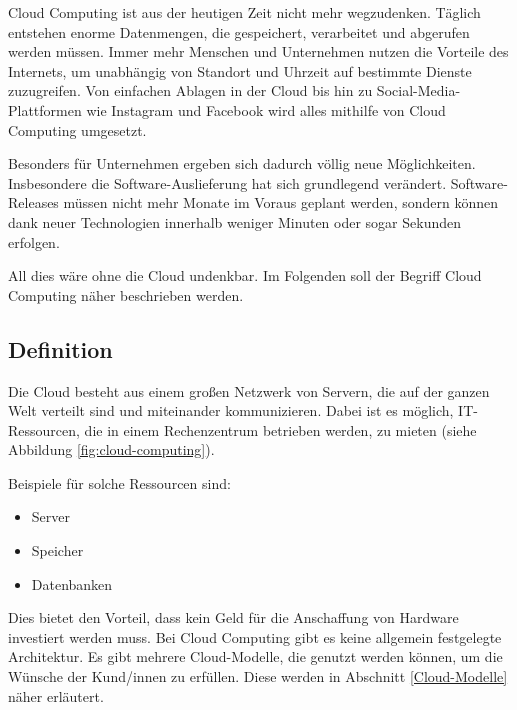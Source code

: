 
Cloud Computing ist aus der heutigen Zeit nicht mehr wegzudenken. Täglich entstehen enorme Datenmengen, die gespeichert, verarbeitet und abgerufen werden müssen. Immer mehr Menschen und Unternehmen nutzen die Vorteile des Internets, um unabhängig von Standort und Uhrzeit auf bestimmte Dienste zuzugreifen. Von einfachen Ablagen in der Cloud bis hin zu Social-Media-Plattformen wie Instagram und Facebook wird alles mithilfe von Cloud Computing umgesetzt.

Besonders für Unternehmen ergeben sich dadurch völlig neue Möglichkeiten. Insbesondere die Software-Auslieferung hat sich grundlegend verändert. 
Software-Releases müssen nicht mehr Monate im Voraus geplant werden, sondern können dank neuer Technologien innerhalb weniger Minuten oder sogar Sekunden erfolgen.\\
\cite{EA:Web59}

All dies wäre ohne die Cloud undenkbar. Im Folgenden soll der Begriff Cloud Computing näher beschrieben werden.



    \subsection{Definition}

    Die Cloud besteht aus einem großen Netzwerk von Servern, die auf der ganzen Welt verteilt sind und miteinander kommunizieren.
    Dabei ist es möglich, IT-Ressourcen, die in einem Rechenzentrum betrieben werden, zu mieten (siehe Abbildung \ref{fig:cloud-computing}). 
    
    Beispiele für solche Ressourcen sind:
    \begin{itemize}
        \item Server
        \item Speicher
        \item Datenbanken
    \end{itemize}

    Dies bietet den Vorteil, dass kein Geld für die Anschaffung von Hardware investiert werden muss. Bei Cloud Computing gibt es keine allgemein festgelegte Architektur. Es gibt mehrere Cloud-Modelle, die genutzt werden können, um die Wünsche der Kund/innen zu erfüllen.
    Diese werden in Abschnitt \ref{Cloud-Modelle} näher erläutert.
    \cite{EA:Web55}
    
